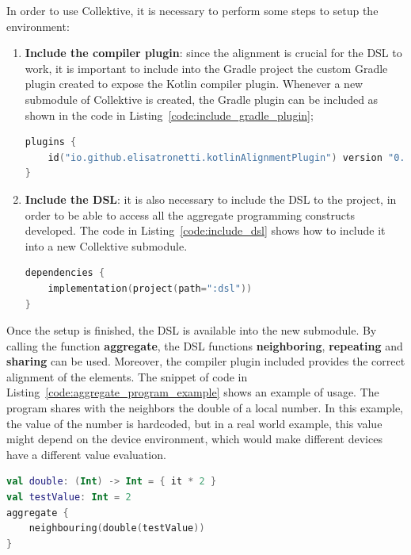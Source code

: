 In order to use Collektive, it is necessary to perform some steps to setup the environment:
\begin{enumerate}
    \item \textbf{Include the compiler plugin}: since the alignment is crucial for the DSL to work, it is important to include into the Gradle project the custom Gradle plugin created to expose the Kotlin compiler plugin.\newline
    Whenever a new submodule of Collektive is created, the Gradle plugin can be included as shown in the code in Listing~\ref{code:include_gradle_plugin};
\begin{lstlisting}[caption={Inclusion of the custom Gradle plugin to a local Gradle submodule}, captionpos=b, language=Kotlin, label={code:include_gradle_plugin}]
plugins {
    id("io.github.elisatronetti.kotlinAlignmentPlugin") version "0.1.0"
}
\end{lstlisting}
    \item \textbf{Include the DSL}: it is also necessary to include the DSL to the project, in order to be able to access all the aggregate programming constructs developed. The code in Listing~\ref{code:include_dsl} shows how to include it into a new Collektive submodule.
\begin{lstlisting}[caption={Inclusion of the DSL to a local Gradle submodule}, captionpos=b, language=Kotlin, label={code:include_dsl}]
dependencies {
    implementation(project(path=":dsl"))
}
\end{lstlisting}
\end{enumerate}

Once the setup is finished, the DSL is available into the new submodule. By calling the function \textbf{aggregate}, the DSL functions \textbf{neighboring}, \textbf{repeating} and \textbf{sharing} can be used. Moreover, the compiler plugin included provides the correct alignment of the elements.\newline
The snippet of code in Listing~\ref{code:aggregate_program_example} shows an example of usage. The program shares with the neighbors the double of a local number. In this example, the value of the number is hardcoded, but in a real world example, this value might depend on the device environment, which would make different devices have a different value evaluation.
\begin{lstlisting}[caption={Example of an aggregate program developed with Collektive}, captionpos=b, language=Kotlin, label={code:aggregate_program_example}]
val double: (Int) -> Int = { it * 2 }
val testValue: Int = 2
aggregate {
    neighbouring(double(testValue))
}
\end{lstlisting}

